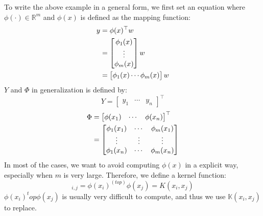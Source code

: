 To write the above example in a general form, we first set an equation where $\phi(\cdot)\in\mathbb{R}^m$ and $\phi(x)$ is defined as the mapping function:
\begin{align}
    y&=\phi(x)^\top w \notag\\
     &= \begin{bmatrix}
        \phi_1(x) \\
        \vdots \\
        \phi_m(x)
        \end{bmatrix} w \notag\\
     &= \begin{bmatrix}
        \phi_1(x)\cdots\phi_m(x)
        \end{bmatrix} w
\end{align}
$Y$ and $\Phi$ in generalization is defined by:
\begin{equation}
    Y=\begin{bmatrix}
         y_1&\cdots&y_n
      \end{bmatrix}^\top 
\end{equation}
\begin{align}
    \Phi&=\begin{bmatrix}
           \phi(x_1)&\cdots&\phi(x_n) 
          \end{bmatrix}^\top \notag\\
        &=\begin{bmatrix}
           \phi_1(x_1)&\cdots&\phi_m(x_1)\\
           \vdots&\vdots&\vdots \\
           \phi_1(x_n)&\cdots&\phi_m(x_n)
          \end{bmatrix}
\end{align}
In most of the cases, we want to avoid computing $\phi(x)$ in a explicit way, especially when $m$ is very large. Therefore, we define a kernel function:
\begin{equation}
    [\Phi\Phi^(top)]_{i,j}=\phi(x_i)^(top) \phi(x_j)=K(x_i,x_j)
\end{equation}
$\phi(x_i)^top\phi(x_j)$ is usually very difficult to compute, and thus we use $\mathbb{K}(x_i,x_j)$ to replace.

